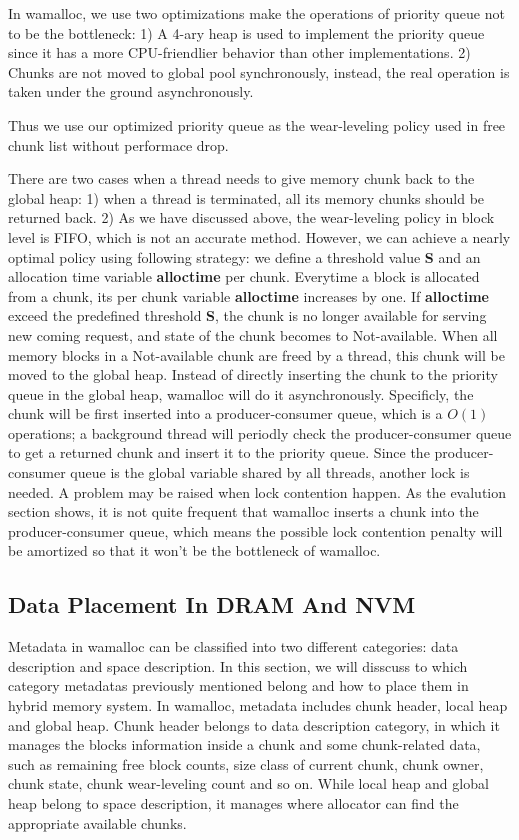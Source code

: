 \documentclass{vldb}
\begin{document}
In wamalloc, we use two optimizations make the operations of priority queue not to be the bottleneck:
1) A 4-ary heap is used to implement the priority queue since it has a more CPU-friendlier behavior than other implementations.
2) Chunks are not moved to global pool synchronously, instead, the real operation is taken under the ground asynchronously.

Thus we use our optimized priority queue as the wear-leveling policy used in free chunk list without performace drop.

There are two cases when a thread needs to give memory chunk back to the global heap: 
1) when a thread is terminated, all its memory chunks should be returned back.
2) As we have discussed above, the wear-leveling policy in block level is FIFO, which is not an accurate method.
However, we can achieve a nearly optimal policy using following strategy: 
we define a threshold value \textbf{S} and an allocation time variable \textbf{alloctime} per chunk. 
Everytime a block is allocated from a chunk, its per chunk variable \textbf{alloctime} increases by one.
If \textbf{alloctime} exceed the predefined threshold \textbf{S}, 
the chunk is no longer available for serving new coming request, and state of the chunk becomes to Not-available.
When all memory blocks in a Not-available chunk are freed by a thread, this chunk will be moved to the global heap.
Instead of directly inserting the chunk to the priority queue in the global heap, wamalloc will do it asynchronously.
Specificly, the chunk will be first inserted into a producer-consumer queue, which is a $O(1)$ operations;
a background thread will periodly check the producer-consumer queue to get a returned chunk and insert it to the priority queue.
Since the producer-consumer queue is the global variable shared by all threads, another lock is needed.
A problem may be raised when lock contention happen.
As the evalution section shows, it is not quite frequent that wamalloc inserts a chunk into the producer-consumer queue,
which means the possible lock contention penalty will be amortized so that it won't be the bottleneck of wamalloc.

\subsection{Data Placement In DRAM And NVM}

Metadata in wamalloc can be classified into two different categories: data description and space description.
In this section, we will disscuss to which category metadatas previously mentioned belong and how to place them in hybrid memory system.
In wamalloc, metadata includes chunk header, local heap and global heap.
Chunk header belongs to data description category, in which it manages the blocks information inside a chunk and some chunk-related data, such as remaining free block counts, size class of current chunk, chunk owner, chunk state, chunk wear-leveling count and so on.
While local heap and global heap belong to space description, it manages where allocator can find the appropriate available chunks.
\end{document}

